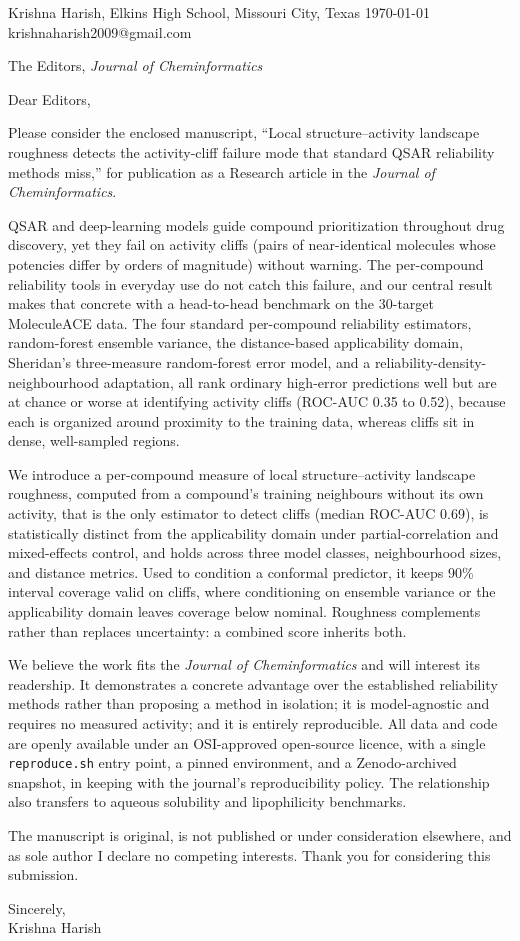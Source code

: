 \documentclass[11pt,letterpaper]{article}
\begin{document}
\noindent Krishna Harish, Elkins High School, Missouri City, Texas \hfill \today\\
\noindent krishnaharish2009@gmail.com

\vspace{1em}
\noindent The Editors, \textit{Journal of Cheminformatics}

\vspace{1em}
\noindent Dear Editors,

Please consider the enclosed manuscript, ``Local structure--activity landscape roughness detects the activity-cliff failure mode that standard QSAR reliability methods miss,'' for publication as a Research article in the \textit{Journal of Cheminformatics}.

QSAR and deep-learning models guide compound prioritization throughout drug discovery, yet they fail on activity cliffs (pairs of near-identical molecules whose potencies differ by orders of magnitude) without warning. The per-compound reliability tools in everyday use do not catch this failure, and our central result makes that concrete with a head-to-head benchmark on the 30-target MoleculeACE data. The four standard per-compound reliability estimators, random-forest ensemble variance, the distance-based applicability domain, Sheridan's three-measure random-forest error model, and a reliability-density-neighbourhood adaptation, all rank ordinary high-error predictions well but are at chance or worse at identifying activity cliffs (ROC-AUC 0.35 to 0.52), because each is organized around proximity to the training data, whereas cliffs sit in dense, well-sampled regions.

We introduce a per-compound measure of local structure--activity landscape roughness, computed from a compound's training neighbours without its own activity, that is the only estimator to detect cliffs (median ROC-AUC 0.69), is statistically distinct from the applicability domain under partial-correlation and mixed-effects control, and holds across three model classes, neighbourhood sizes, and distance metrics. Used to condition a conformal predictor, it keeps 90\% interval coverage valid on cliffs, where conditioning on ensemble variance or the applicability domain leaves coverage below nominal. Roughness complements rather than replaces uncertainty: a combined score inherits both.

We believe the work fits the \textit{Journal of Cheminformatics} and will interest its readership. It demonstrates a concrete advantage over the established reliability methods rather than proposing a method in isolation; it is model-agnostic and requires no measured activity; and it is entirely reproducible. All data and code are openly available under an OSI-approved open-source licence, with a single \texttt{reproduce.sh} entry point, a pinned environment, and a Zenodo-archived snapshot, in keeping with the journal's reproducibility policy. The relationship also transfers to aqueous solubility and lipophilicity benchmarks.

The manuscript is original, is not published or under consideration elsewhere, and as sole author I declare no competing interests. Thank you for considering this submission.

\vspace{1em}
\noindent Sincerely,\\[1.5em]
Krishna Harish
\end{document}
